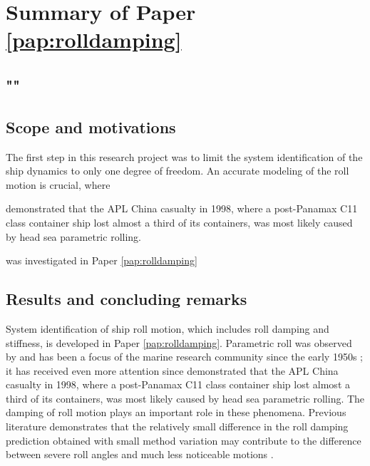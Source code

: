 \section{Summary of Paper \ref{pap:rolldamping}}
\subsection*{""}
\subsection*{Scope and motivations}
The first step in this research project was to limit the system identification of the ship dynamics to only one degree of freedom. An accurate modeling of the roll motion is crucial, where 

\textcite{france_investigation_2001} demonstrated that the APL China casualty in 1998, where a post-Panamax C11 class container ship lost almost a third of its containers, was most likely caused by head sea parametric rolling.

was investigated in Paper \ref{pap:rolldamping} 

\subsection*{Results and concluding remarks}


System identification of ship roll motion, which includes roll damping and stiffness, is developed in Paper \ref{pap:rolldamping}. Parametric roll was observed by \textcite{froude_rolling_1861} and has been a focus of the marine research community since the early 1950s \parencite{galeazzi_early_2013}; it has received even more attention since \textcite{france_investigation_2001} demonstrated that the APL China casualty in 1998, where a post-Panamax C11 class container ship lost almost a third of its containers, was most likely caused by head sea parametric rolling. The damping of roll motion plays an important role in these phenomena. Previous literature demonstrates that the relatively small difference in the roll damping prediction obtained with small method variation may contribute to the difference between severe roll angles and much less noticeable motions \cite{soder_ikeda_2019}.

